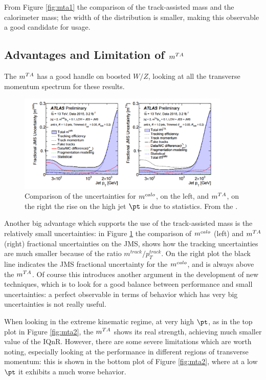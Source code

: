 From Figure \ref{fig:mta1} the comparison of the track-assisted mass and the calorimeter mass; the width of the distribution is smaller, making this observable a good candidate for usage.


\subsection{Advantages and Limitation of $\mta$}
The $\mta$ has a good handle on boosted $W/Z$, looking at all the transverse momentum spectrum for these results.

\begin{figure}[!ht]
  \centering
      \includegraphics[width=0.9\textwidth]{jet_part/uncert.png}
  \caption[Comparison of the uncertainties for $\mcal$ and $\mta$]{Comparison of the uncertainties for $\mcal$, on the left, and $\mta$, on the right the rise on the high jet $\pt$ is due to statistics. From the \cite{art35}.}
  \label{fig:uncert}
\end{figure}

Another big advantage which supports the use of the track-assisted mass is the relatively small uncertainties: in Figure \ref{fig:uncert} the comparison of $\mcal$ (left) and $\mta$ (right) fractional uncertainties on the JMS, shows how the tracking uncertainties are much smaller because of the ratio $m^{track}/p_T^{track}$. On the right plot the black line indicates the JMS fractional uncertainty for the $\mcal$, and is always above the $\mta$. Of course this introduces another argument in the development of new techniques, which is to look for a good balance between performance and small uncertainties: a perfect observable in terms of behavior which has very big uncertainties is not really useful.


When looking in the extreme kinematic regime, at very high $\pt$, as in the top plot in Figure \ref{fig:mta2}, the $\mta$ shows its real strength, achieving much smaller value of the IQnR.
However, there are some severe limitations which are worth noting, especially looking at the performance in different regions of transverse momentum: this is shown in the bottom plot of Figure \ref{fig:mta2}, where at a low $\pt$ it exhibits a much worse behavior.

